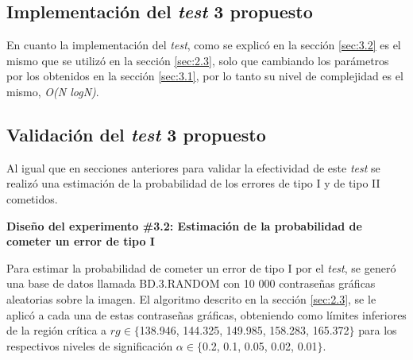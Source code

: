 \documentclass[12pt]{report}
\begin{document}
\subsection{Implementación del \textit{test} 3 propuesto }
\label{sec:3.3}

En cuanto  la implementación del \textit{test}, como se explicó en la sección \ref{sec:3.2} es el mismo que se utilizó en la sección \ref{sec:2.3}, solo que cambiando los parámetros por los obtenidos en la sección \ref{sec:3.1}, por lo tanto su nivel de complejidad es el mismo, \textit{O(N logN)}.

%	
%	

\subsection{Validación del \textit{test} 3 propuesto}
\label{sec:3.4}


Al igual que en secciones anteriores para validar la efectividad de este \textit{test} se realizó una estimación de la probabilidad de los errores de tipo I y de tipo II cometidos.
	 
\textbf{Diseño del experimento \#3.2: Estimación de la probabilidad de cometer un error de tipo I} 

Para estimar la probabilidad de cometer un error de tipo I por el\textit{ test}, se generó una base de datos llamada BD.3.RANDOM con 10 000 contraseñas gráficas aleatorias sobre la imagen. El algoritmo descrito en la sección \ref{sec:2.3}, se le aplicó a cada una de estas contraseñas gráficas, obteniendo como límites inferiores de la región crítica a $rg \in \{$138.946, 144.325, 149.985, 158.283, 165.372$\}$  para los respectivos  niveles de significación $\alpha \in \{$0.2, 0.1, 0.05, 0.02, 0.01$\}$.
\end{document}

